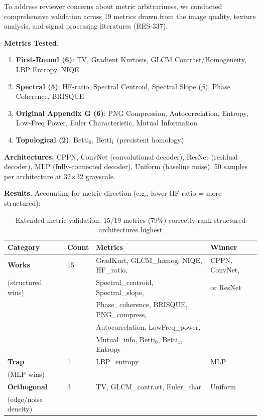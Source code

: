 To address reviewer concerns about metric arbitrariness, we conducted comprehensive validation across 19 metrics drawn from the image quality, texture analysis, and signal processing literatures (RES-337).

\textbf{Metrics Tested.}
\begin{enumerate}[topsep=2pt,itemsep=1pt]
    \item \textbf{First-Round (6)}: TV, Gradient Kurtosis, GLCM Contrast/Homogeneity, LBP Entropy, NIQE
    \item \textbf{Spectral (5)}: HF-ratio, Spectral Centroid, Spectral Slope ($\beta$), Phase Coherence, BRISQUE
    \item \textbf{Original Appendix G (6)}: PNG Compression, Autocorrelation, Entropy, Low-Freq Power, Euler Characteristic, Mutual Information
    \item \textbf{Topological (2)}: Betti$_0$, Betti$_1$ (persistent homology)
\end{enumerate}

\textbf{Architectures.} CPPN, ConvNet (convolutional decoder), ResNet (residual decoder), MLP (fully-connected decoder), Uniform (baseline noise). 50 samples per architecture at 32$\times$32 grayscale.

\textbf{Results.} Accounting for metric direction (e.g., lower HF-ratio = more structured):

\begin{table}[H]
\centering
\caption{Extended metric validation: 15/19 metrics (79\%) correctly rank structured architectures highest}
\label{tab:extended_metrics}
\begin{tabular}{llll}
\toprule
Category & Count & Metrics & Winner \\
\midrule
\textbf{Works} & 15 & GradKurt, GLCM\_homog, NIQE, HF\_ratio, & CPPN, ConvNet, \\
(structured wins) & & Spectral\_centroid, Spectral\_slope, & or ResNet \\
& & Phase\_coherence, BRISQUE, PNG\_compress, & \\
& & Autocorrelation, LowFreq\_power, & \\
& & Mutual\_info, Betti$_0$, Betti$_1$, Entropy & \\
\midrule
\textbf{Trap} & 1 & LBP\_entropy & MLP \\
(MLP wins) & & & \\
\midrule
\textbf{Orthogonal} & 3 & TV, GLCM\_contrast, Euler\_char & Uniform \\
(edge/noise density) & & & \\
\bottomrule
\end{tabular}
\end{table}

